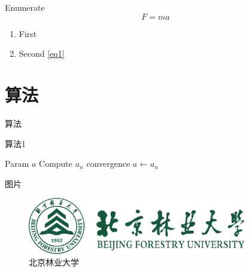 \documentclass[hyperref,UTF8,11pt,aspectratio=169]{beamer}
\begin{document}
\begin{frame}{Enumerate}
    \begin{equation}
        F=ma\label{eq1}
    \end{equation}
    \begin{enumerate}
        \item First 
        \item Second \eqref{eq1}
    \end{enumerate}
\end{frame}

\section{算法}

\begin{frame}{算法}
    \begin{algorithm}[H]
        \caption{算法1}\label{alg:em}
        \begin{algorithmic}[1]
            \REQUIRE		Param
            \ENSURE			$a$
            \REPEAT
            \STATE			Compute $a_n$
            \UNTIL			convergence
            \RETURN			$a\leftarrow a_n$
        \end{algorithmic}
    \end{algorithm}    
\end{frame}

\begin{frame}{图片}
    \begin{figure}
        \centering
        \includegraphics[width=0.85\textwidth]{logo_new.png}
        \caption{北京林业大学}\label{fig:nk}
    \end{figure}
\end{frame}
\end{document}
